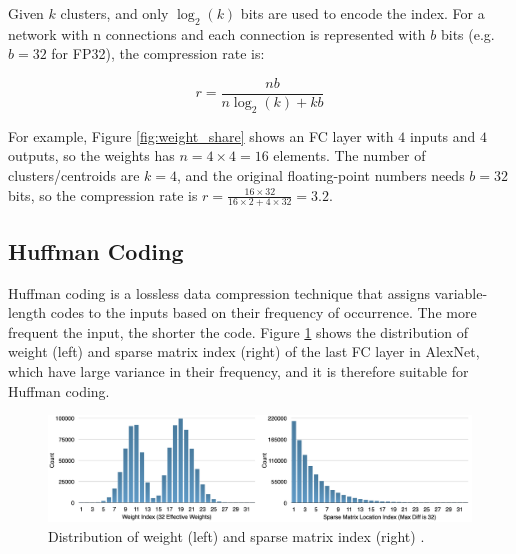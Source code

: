 \documentclass[12pt]{article}
\begin{document}
Given $k$ clusters, and only $\log_2(k)$ bits are used to encode the index. For a network with n connections and each connection is represented with $b$ bits (e.g. $b=32$ for FP32), the compression rate is:

$$
r = \frac{nb}{n\log_2(k) + kb}
$$

For example, Figure \ref{fig:weight_share} shows an FC layer with $4$ inputs and $4$ outputs, so the weights has $n = 4 \times 4 = 16$ elements. The number of clusters/centroids are $k=4$, and the original floating-point numbers needs $b=32$ bits, so the compression rate is $r = \frac{16 \times 32}{16 \times 2 + 4 \times 32} = 3.2$.




\subsection{Huffman Coding}

Huffman coding is a lossless data compression technique that assigns variable-length codes to the inputs based on their frequency of occurrence. The more frequent the input, the shorter the code. Figure \ref{fig:weight_dist} shows the distribution of weight (left) and sparse matrix index (right) of the last FC layer in AlexNet, which have large variance in their frequency, and it is therefore suitable for Huffman coding.

\begin{figure}[h]
    \centering
    \includegraphics[width=0.8\linewidth]{images/f5_weight_dist.png}
    \caption{Distribution of weight (left) and sparse matrix index (right) \cite{han2015deep_compression}.}
    \label{fig:weight_dist}
\end{figure}
\end{document}
